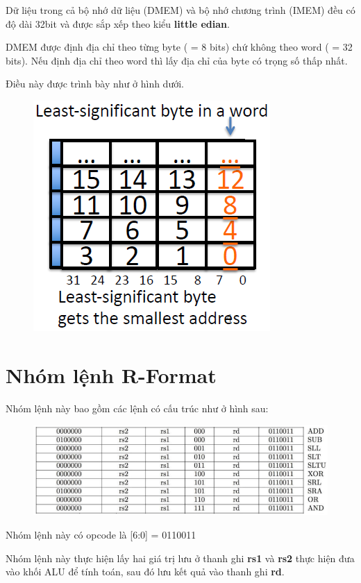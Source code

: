 \documentclass[E:/Latex/ExtraWork/ComputerArchitechture/Report.tex]{subfiles}
\begin{document}
	Dữ liệu trong cả bộ nhớ dữ liệu (DMEM) và bộ nhớ chương trình (IMEM) đều có độ dài 32bit và được sắp xếp theo kiểu \textbf {little edian}.
							
	DMEM được định địa chỉ theo từng byte ( = 8 bits) chứ không theo word ( = 32 bits). Nếu định địa chỉ theo word thì lấy địa chỉ của byte có trọng số thấp nhất.
							
	Điều này được trình bày như ở hình dưới.
			\begin{figure}[h!]
				\includegraphics[scale = 0.7]{Figure/Fig2.png}
				\centering
			\end{figure}	
	\newpage

\section{Nhóm lệnh R-Format}
	Nhóm lệnh này bao gồm các lệnh có cấu trúc như ở hình sau:

	\begin{figure}[h!]
				\includegraphics[scale = 0.9]{Figure/Fig3.png}
				\centering
			\end{figure}	

	Nhóm lệnh này có opcode là [6:0] = 0110011

	Nhóm lệnh này thực hiện lấy hai giá trị lưu ở thanh ghi \textbf{rs1} và \textbf{rs2} thực hiện đưa vào khối ALU để tính toán, sau đó lưu kết quả vào thanh ghi \textbf{rd}.
\end{document}
